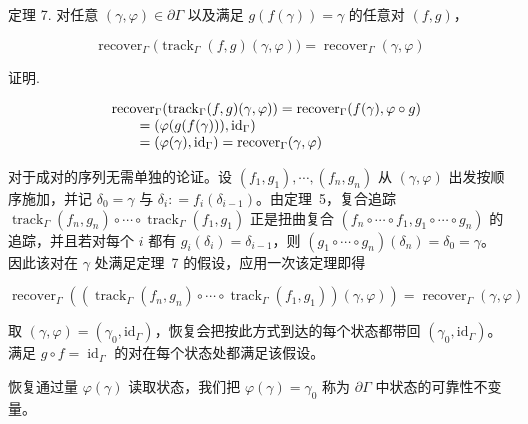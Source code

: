 \documentclass[
  10
]{article}
\begin{document}
定理 7. 对任意 \(( \gamma , \varphi ) \in \partial \Gamma\) 以及满足
\(g ( f ( \gamma ) ) = \gamma\) 的任意对 \(( f , g )\)，

\[
\operatorname { r e c o v e r } _ { \Gamma } \bigl ( \operatorname { t r a c k } _ { \Gamma } ( f , g ) ( \gamma , \varphi ) \bigr ) = \operatorname { r e c o v e r } _ { \Gamma } ( \gamma , \varphi )\tag{10}
\]

证明.

\[
\begin{array} { r l }
  & \operatorname { r e c o v e r } _ { \Gamma } ( \operatorname { t r a c k } _ { \Gamma } ( f , g ) ( \gamma , \varphi ) ) = \operatorname { r e c o v e r } _ { \Gamma } ( f ( \gamma ) , \varphi \circ g ) \\
  & \qquad = ( \varphi ( g ( f ( \gamma ) ) ) , \mathrm { i d } _ { \Gamma } ) \\
  & \qquad = ( \varphi ( \gamma ) , \mathrm { i d } _ { \Gamma } ) = \operatorname { r e c o v e r } _ { \Gamma } ( \gamma , \varphi )
\end{array}
\]

对于成对的序列无需单独的论证。设 \(( f _ { 1 } , g _ { 1 } ) , \cdots , ( f _ { n } , g _ { n } )\) 从
\(( \gamma , \varphi )\) 出发按顺序施加，并记 \(\delta _ { 0 } = \gamma\) 与
\(\delta _ { i } : = f _ { i } ( \delta _ { i - 1 } )\)。由定理~5，复合追踪
\(\operatorname { t r a c k } _ { \Gamma } ( f _ { n } , g _ { n } ) \circ \cdots \circ \operatorname { t r a c k } _ { \Gamma } ( f _ { 1 } , g _ { 1 } )\)
正是扭曲复合
\(( f _ { n } \circ \cdots \circ f _ { 1 } , g _ { 1 } \circ \cdots \circ g _ { n } )\)
的追踪，并且若对每个 \(i\) 都有 \(g _ { i } ( \delta _ { i } ) = \delta _ { i - 1 }\)，则
\(( g _ { 1 } \circ \cdots \circ g _ { n } ) ( \delta _ { n } ) = \delta _ { 0 } = \gamma\)。
因此该对在 \(\gamma\) 处满足定理~7 的假设，应用一次该定理即得

\[
\operatorname { r e c o v e r } _ { \Gamma } ( ( \operatorname { t r a c k } _ { \Gamma } ( f _ { n } , g _ { n } ) \circ \dotsb \circ \operatorname { t r a c k } _ { \Gamma } ( f _ { 1 } , g _ { 1 } ) ) ( \gamma , \varphi ) ) = \operatorname { r e c o v e r } _ { \Gamma } ( \gamma , \varphi )\tag{11}
\]

取 \(( \gamma , \varphi ) = ( \gamma _ { 0 } , \mathrm { i d } _ { \Gamma } )\)，恢复会把按此方式到达的每个状态都带回
\(( \gamma _ { 0 } , \mathrm { i d } _ { \Gamma } )\)。满足 \(g \circ f = \operatorname { i d } _ { \Gamma }\) 的对在每个状态处都满足该假设。

恢复通过量 \(\varphi ( \gamma )\) 读取状态，我们把 \(\varphi ( \gamma ) = \gamma _ { 0 }\) 称为 \(\partial \Gamma\) 中状态的可靠性不变量。
\end{document}
